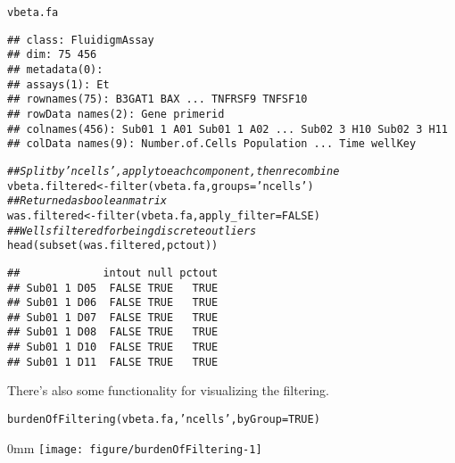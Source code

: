 \documentclass{article}\usepackage[]{graphicx}\usepackage[usenames,dvipsnames]{color}
\makeatletter
\def\maxwidth{ %
  \ifdim\Gin@nat@width>\linewidth
    \linewidth
  \else
    \Gin@nat@width
  \fi
}
\newcommand{\hlnum}[1]{\textcolor[rgb]{0.816,0.125,0.439}{#1}}%
\newcommand{\hlstr}[1]{\textcolor[rgb]{0.251,0.627,0.251}{#1}}%
\newcommand{\hlcom}[1]{\textcolor[rgb]{0.502,0.502,0.502}{\textit{#1}}}%
\newcommand{\hlstd}[1]{\textcolor[rgb]{0.251,0.251,0.251}{#1}}%
\newcommand{\hlkwb}[1]{\textcolor[rgb]{0,0,0}{#1}}%
\newcommand{\hlkwc}[1]{\textcolor[rgb]{0.251,0.251,0.251}{#1}}%
\newcommand{\hlkwd}[1]{\textcolor[rgb]{0.878,0.439,0.125}{#1}}%
\newenvironment{knitrout}{}{} %
\makeatother
\begin{document}
\begin{knitrout}
\color{fgcolor}\begin{kframe}
\begin{alltt}
\hlstd{vbeta.fa}
\end{alltt}
\begin{verbatim}
## class: FluidigmAssay 
## dim: 75 456 
## metadata(0):
## assays(1): Et
## rownames(75): B3GAT1 BAX ... TNFRSF9 TNFSF10
## rowData names(2): Gene primerid
## colnames(456): Sub01 1 A01 Sub01 1 A02 ... Sub02 3 H10 Sub02 3 H11
## colData names(9): Number.of.Cells Population ... Time wellKey
\end{verbatim}
\begin{alltt}
\hlcom{## Split by 'ncells', apply to each component, then recombine}
\hlstd{vbeta.filtered} \hlkwb{<-} \hlkwd{filter}\hlstd{(vbeta.fa,} \hlkwc{groups}\hlstd{=}\hlstr{'ncells'}\hlstd{)}
\hlcom{## Returned as boolean matrix}
\hlstd{was.filtered} \hlkwb{<-} \hlkwd{filter}\hlstd{(vbeta.fa,} \hlkwc{apply_filter}\hlstd{=}\hlnum{FALSE}\hlstd{)}
\hlcom{## Wells filtered for being discrete outliers}
\hlkwd{head}\hlstd{(}\hlkwd{subset}\hlstd{(was.filtered, pctout))}
\end{alltt}
\begin{verbatim}
##             intout null pctout
## Sub01 1 D05  FALSE TRUE   TRUE
## Sub01 1 D06  FALSE TRUE   TRUE
## Sub01 1 D07  FALSE TRUE   TRUE
## Sub01 1 D08  FALSE TRUE   TRUE
## Sub01 1 D10  FALSE TRUE   TRUE
## Sub01 1 D11  FALSE TRUE   TRUE
\end{verbatim}
\end{kframe}
\end{knitrout}

There's also some functionality for visualizing the filtering.

\begin{knitrout}
\color{fgcolor}\begin{kframe}
\begin{alltt}
\hlkwd{burdenOfFiltering}\hlstd{(vbeta.fa,} \hlstr{'ncells'}\hlstd{,} \hlkwc{byGroup}\hlstd{=}\hlnum{TRUE}\hlstd{)}
\end{alltt}
\end{kframe}\begin{adjustwidth}{\fltoffset}{0mm}
\texttt{[image: figure/burdenOfFiltering-1]} \end{adjustwidth}
\end{knitrout}
\end{document}
